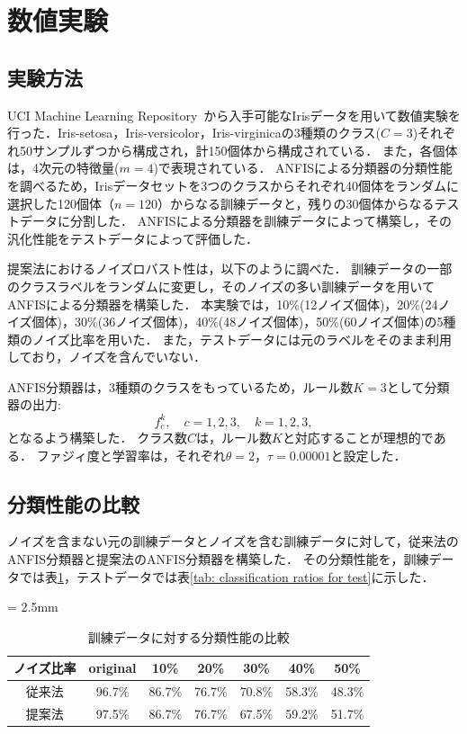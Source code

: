 \documentclass{ujarticle}
\begin{document}
\section{数値実験}
\subsection{実験方法}

UCI Machine Learning Repository~\cite{UCI_repository2019}から入手可能なIrisデータを用いて数値実験を行った．Iris-setosa，Iris-versicolor，Iris-virginicaの3種類のクラス($C=3$)それぞれ50サンプルずつから構成され，計150個体から構成されている．
また，各個体は，4次元の特徴量($m=4$)で表現されている．
ANFISによる分類器の分類性能を調べるため，Irisデータセットを3つのクラスからそれぞれ40個体をランダムに選択した120個体（$n=120$）からなる訓練データと，残りの30個体からなるテストデータに分割した．
ANFISによる分類器を訓練データによって構築し，その汎化性能をテストデータによって評価した．

提案法におけるノイズロバスト性は，以下のように調べた．
訓練データの一部のクラスラベルをランダムに変更し，そのノイズの多い訓練データを用いてANFISによる分類器を構築した．
本実験では，10\%(12ノイズ個体)，20\%(24ノイズ個体)，30\%(36ノイズ個体)，40\%(48ノイズ個体)，50\%(60ノイズ個体)の5種類のノイズ比率を用いた．
また，テストデータには元のラベルをそのまま利用しており，ノイズを含んでいない．

ANFIS分類器は，3種類のクラスをもっているため，ルール数$K=3$として分類器の出力:
\[f_c^k, \quad c=1,2,3, \quad k=1,2,3,\]
となるよう構築した．
クラス数$C$は，ルール数$K$と対応することが理想的である．
ファジィ度と学習率は，それぞれ$\theta = 2$，$\tau = 0.00001$と設定した．

\subsection{分類性能の比較}

ノイズを含まない元の訓練データとノイズを含む訓練データに対して，従来法のANFIS分類器と提案法のANFIS分類器を構築した．
その分類性能を，訓練データでは表\ref{tab: classification ratios for training}，テストデータでは表\ref{tab: classification ratios for test}に示した．

\begin{table}[!htbp]
\caption{訓練データに対する分類性能の比較}
\label{tab: classification ratios for training}
\centering
{\tabcolsep = 2.5mm
\begin{tabular}{c||c|c|c|c|c|c}\hline%
ノイズ比率	& original& 10\% & 20\%	& 30\% 	& 40\% & 50\%    \\\hline\hline
従来法	& 96.7\% & 86.7\% & 76.7\% & 70.8\% & 58.3\% & 48.3\%    \\\hline
提案法 & 97.5\% & 86.7\% & 76.7\% & 67.5\% & 59.2\% & 51.7\%	 \\\hline
\end{tabular}
}
\end{table}
\end{document}
